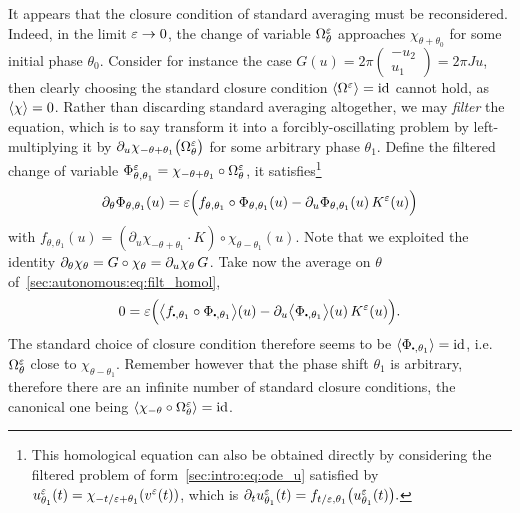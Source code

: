 It appears that the closure condition of standard averaging must be
reconsidered. Indeed, in the limit $\varepsilon \rightarrow 0$, the change of
variable $\Omega^{\varepsilon}_\theta$ approaches $\chi_{\theta+\theta_0}$ for some
initial phase $\theta_0$. Consider for instance the case $G(u) =
2\pi\begin{pmatrix} -u_2 \\ u_1 \end{pmatrix} = 2\pi Ju$, then clearly
choosing the standard closure condition $\langle \Omega^{\varepsilon} \rangle = \operatorname{id}$ cannot
hold, as $\langle \chi \rangle = 0$. 
%
Rather than discarding standard averaging altogether, we may
\textit{filter} the equation, which is to say transform it into a
forcibly-oscillating problem by left-multiplying it by $\partial_u
\chi_{-\theta+\theta_1} \big(\Omega^{\varepsilon}_\theta \big)$ for some arbitrary
phase $\theta_1$. Define the filtered change of variable
$\Phi^{\varepsilon}_{\theta, \theta_1} = \chi_{-\theta + \theta_1} \circ
\Omega^{\varepsilon}_{\theta}$, it satisfies\footnote{ %
  This homological equation can also be obtained directly by considering
  the filtered problem of form~\eqref{sec:intro:eq:ode_u} satisfied by
  $u^{\varepsilon}_{\theta_1}(t) = \chi_{-t/\varepsilon+\theta_1}(v^{\varepsilon}(t))$, which is $
  \partial_t u^{\varepsilon}_{\theta_1}(t) = f_{t/\varepsilon, \theta_1} \big( u^{\varepsilon}
  _{\theta_1} (t) \big). $ %
}
\begin{equation} \label{sec:autonomous:eq:filt_homol}
  \partial_\theta \Phi_{\theta, \theta_1} (u)
  = \varepsilon\Big( f_{\theta, \theta_1} \circ \Phi_{\theta, \theta_1}(u) - \partial_u \Phi_{\theta, \theta_1}(u) \, K^{\varepsilon}(u) \Big) 
\end{equation}
with $f_{\theta, \theta_1}(u) = \left(\partial_u \chi_{-\theta +
\theta_1}\cdot K \right) \circ \chi_{\theta-\theta_1}(u)$. Note that we
exploited the identity $\partial_\theta \chi_\theta = G \circ \chi_\theta =
\partial_u \chi_\theta \, G$. 
%
Take now the average on $\theta$ of~\eqref{sec:autonomous:eq:filt_homol},
\begin{equation} \label{sec:autonumous:eq:filt_homol_avg}
  0 = \eps\Big( 
    \bLL f_{\bigcdot, \theta_1}  \circ \Phi_{\bigcdot, \theta_1} \bRR (u) 
    - \pa_u \bLL \Phi_{\bigcdot, \theta_1} \bRR (u) \, K^\eps(u) 
  \Big) . 
\end{equation}
The standard choice of closure condition therefore seems to be $\LL
\Phi_{\bigcdot, \theta_1} \RR = \id$, i.e. $\Omega^{\varepsilon}_\theta$ close to
$\chi_{\theta - \theta_1}$. Remember however that the phase shift
$\theta_1$ is arbitrary, therefore there are an infinite number of
standard closure conditions, the canonical one being $\langle \chi_{-\theta}
\circ \Omega^{\varepsilon}_\theta \rangle = \operatorname{id}$. 


